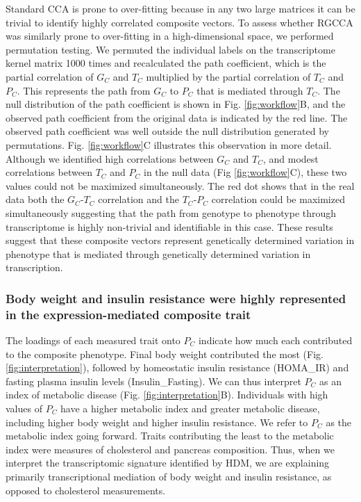 \documentclass[
]{article}
\begin{document}
Standard CCA is prone to over-fitting because in any two large matrices
it can be trivial to identify highly correlated composite vectors. To
assess whether RGCCA was similarly prone to over-fitting in a
high-dimensional space, we performed permutation testing. We permuted
the individual labels on the transcriptome kernel matrix 1000 times and
recalculated the path coefficient, which is the partial correlation of
\(G_C\) and \(T_C\) multiplied by the partial correlation of \(T_C\) and
\(P_C\). This represents the path from \(G_C\) to \(P_C\) that is
mediated through \(T_C\). The null distribution of the path coefficient
is shown in Fig. \ref{fig:workflow}B, and the observed path coefficient
from the original data is indicated by the red line. The observed path
coefficient was well outside the null distribution generated by
permutations. Fig. \ref{fig:workflow}C illustrates this observation in
more detail. Although we identified high correlations between \(G_C\)
and \(T_C\), and modest correlations between \(T_C\) and \(P_C\) in the
null data (Fig \ref{fig:workflow}C), these two values could not be
maximized simultaneously. The red dot shows that in the real data both
the \(G_C\)-\(T_C\) correlation and the \(T_C\)-\(P_C\) correlation
could be maximized simultaneously suggesting that the path from genotype
to phenotype through transcriptome is highly non-trivial and
identifiable in this case. These results suggest that these composite
vectors represent genetically determined variation in phenotype that is
mediated through genetically determined variation in transcription.

\subsubsection{Body weight and insulin resistance were highly
represented in the expression-mediated composite
trait}\label{body-weight-and-insulin-resistance-were-highly-represented-in-the-expression-mediated-composite-trait}

The loadings of each measured trait onto \(P_C\) indicate how much each
contributed to the composite phenotype. Final body weight contributed
the most (Fig. \ref{fig:interpretation}), followed by homeostatic
insulin resistance (HOMA\_IR) and fasting plasma insulin levels
(Insulin\_Fasting). We can thus interpret \(P_C\) as an index of
metabolic disease (Fig. \ref{fig:interpretation}B). Individuals with
high values of \(P_C\) have a higher metabolic index and greater
metabolic disease, including higher body weight and higher insulin
resistance. We refer to \(P_C\) as the metabolic index going forward.
Traits contributing the least to the metabolic index were measures of
cholesterol and pancreas composition. Thus, when we interpret the
transcriptomic signature identified by HDM, we are explaining primarily
transcriptional mediation of body weight and insulin resistance, as
opposed to cholesterol measurements.
\end{document}

